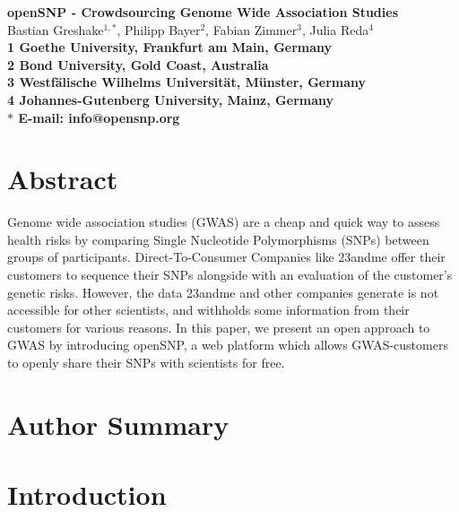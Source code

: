 \documentclass[10pt]{article}
\date{}
\begin{document}
\begin{flushleft}
{\Large
\textbf{openSNP - Crowdsourcing Genome Wide Association Studies}
}
\\
Bastian Greshake$^{1,\ast}$, 
Philipp Bayer$^{2}$, 
Fabian Zimmer$^{3}$,
Julia Reda$^{4}$
\\
\bf{1} Goethe University, Frankfurt am Main, Germany
\\
\bf{2} Bond University, Gold Coast, Australia
\\
\bf{3} Westf\"alische Wilhelms Universit\"at, M\"unster, Germany
\\
\bf{4} Johannes-Gutenberg University, Mainz, Germany
\\
$\ast$ E-mail: info@opensnp.org
\end{flushleft}

\section*{Abstract}
Genome wide association studies (GWAS) are a cheap and quick way to assess health risks by comparing Single Nucleotide Polymorphisms (SNPs) between groups of participants. Direct-To-Consumer Companies like 23andme offer their customers to sequence their SNPs alongside with an evaluation of the customer's genetic risks. However, the data 23andme and other companies generate is not accessible for other scientists, and withholds some information from their customers for various reasons. In this paper, we present an open approach to GWAS by introducing openSNP, a web platform which allows GWAS-customers to openly share their SNPs with scientists for free.  %


\section*{Author Summary}

\section*{Introduction}
\end{document}
